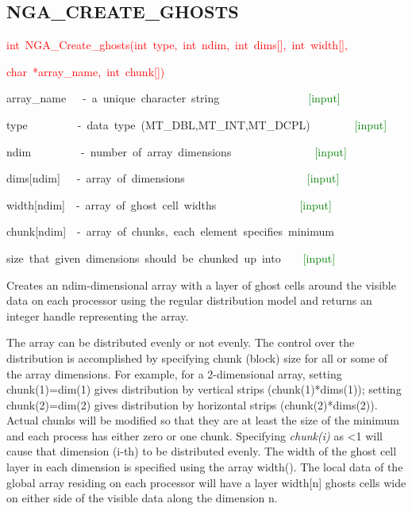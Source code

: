\subsection*{\label{sub:NGA_CREATE_GHOSTS}NGA\_CREATE\_GHOSTS}
\begin{lyxcode}
\textcolor{red}{int~NGA\_Create\_ghosts(int~type,~int~ndim,~int~dims{[}{]},~int~width{[}{]},~}

\textcolor{red}{char~{*}array\_name,~int~chunk{[}{]})}



array\_name~~~-~a~unique~character~string~~~~~~~~~~~~~~~~\textcolor{green}{{[}input{]}}~

type~~~~~~~~~-~data~type~(MT\_DBL,MT\_INT,MT\_DCPL)~~~~~~~~\textcolor{green}{{[}input{]}~}

ndim~~~~~~~~~-~number~of~array~dimensions~~~~~~~~~~~~~~~\textcolor{green}{{[}input{]}}~

dims{[}ndim{]}~~~-~array~of~dimensions~~~~~~~~~~~~~~~~~~~~~~\textcolor{green}{{[}input{]}}~

width{[}ndim{]}~~-~array~of~ghost~cell~widths~~~~~~~~~~~~~~~\textcolor{green}{{[}input{]}~}

chunk{[}ndim{]}~~-~array~of~chunks,~each~element~specifies~minimum

size~that~given~dimensions~should~be~chunked~up~into~~~\textcolor{green}{{}~{[}input{]}}
\end{lyxcode}
Creates an ndim-dimensional array with a layer of ghost cells around
the visible data on each processor using the regular distribution
model and returns an integer handle representing the array.

The array can be distributed evenly or not evenly. The control over
the distribution is accomplished by specifying chunk (block) size
for all or some of the array dimensions. For example, for a 2-dimensional
array, setting chunk(1)=dim(1) gives distribution by vertical strips
(chunk(1){*}dims(1)); setting chunk(2)=dim(2) gives distribution by
horizontal strips (chunk(2){*}dims(2)). Actual chunks will be modified
so that they are at least the size of the minimum and each process
has either zero or one chunk. Specifying \emph{chunk(i)} as <1 will
cause that dimension (i-th) to be distributed evenly. The width of
the ghost cell layer in each dimension is specified using the array
width(). The local data of the global array residing on each processor
will have a layer width{[}n{]} ghosts cells wide on either side of
the visible data along the dimension n.


